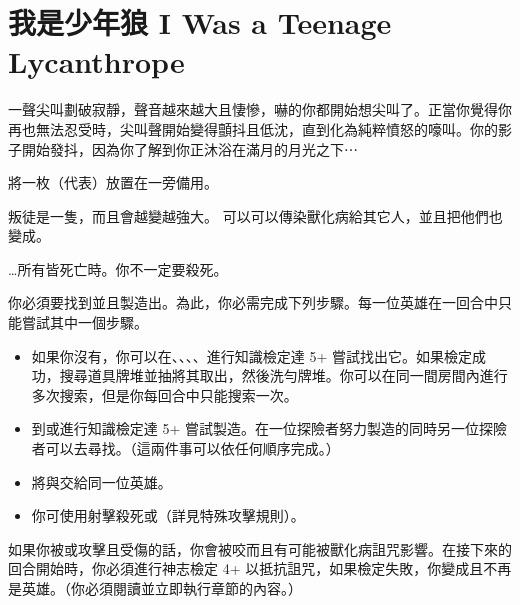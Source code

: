 
\chapter{我是少年狼 I Was a Teenage Lycanthrope}

\begin{HauntStory}
	一聲尖叫劃破寂靜，聲音越來越大且悽慘，嚇的你都開始想尖叫了。正當你覺得你再也無法忍受時，尖叫聲開始變得顫抖且低沈，直到化為純粹憤怒的嚎叫。你的影子開始發抖，因為你了解到你正沐浴在滿月的月光之下⋯
\end{HauntStory}

將一枚（代表）放置在一旁備用。


叛徒是一隻，而且會越變越強大。
可以可以傳染獸化病給其它人，並且把他們也變成。

…所有皆死亡時。你不一定要殺死。

你必須要找到並且製造出。為此，你必需完成下列步驟。每一位英雄在一回合中只能嘗試其中一個步驟。
\begin{itemize}
	\item 如果你沒有，你可以在、、、、進行知識檢定達 5+ 嘗試找出它。如果檢定成功，搜尋道具牌堆並抽將其取出，然後洗勻牌堆。你可以在同一間房間內進行多次搜索，但是你每回合中只能搜索一次。
	\item 到或進行知識檢定達 5+ 嘗試製造。在一位探險者努力製造的同時另一位探險者可以去尋找。（這兩件事可以依任何順序完成。）
	\item 將與交給同一位英雄。
	\item 你可使用射擊殺死或（詳見特殊攻擊規則）。
\end{itemize}

\vfill\null\pagebreak

如果你被或攻擊且受傷的話，你會被咬而且有可能被獸化病詛咒影響。在接下來的回合開始時，你必須進行神志檢定 4+ 以抵抗詛咒，如果檢定失敗，你變成且不再是英雄。（你必須閱讀並立即執行章節的內容。）

